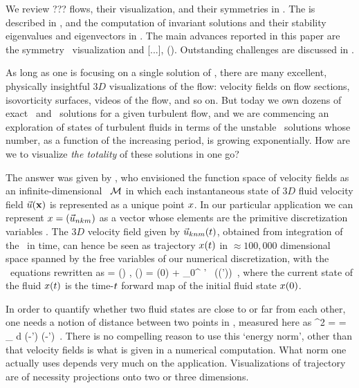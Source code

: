 We review  ??? flows, their visualization, and their symmetries in
. The {\mslices}  is described in ,
and the computation of invariant solutions and their stability
eigenvalues and eigenvectors in .
The main advances reported in this paper are the symmetry \reducedsp\
visualization and [...], (). Outstanding challenges are
discussed in \refsect{s:concl}.


As long as one is focusing on a single solution of \NSe, there are many
excellent, physically insightful $3D$ visualizations of the flow:
velocity fields on flow sections, isovorticity surfaces, videos of the
flow, and so on. But today we own dozens of exact \eqv\ and \reqv\
solutions for a given turbulent flow, and we are commencing an exploration of
states of turbulent fluids in terms of the unstable \po\ solutions whose
number, as a function of the increasing period, is growing exponentially.
How are we to visualize \emph{the totality} of these solutions in one go?

The answer was given by \cite{hopf48}, who envisioned the function space
of {\NS} velocity fields as an infinite-dimensional \statesp\ ${\cal M}$ in
which each instantaneous state of $3D$ fluid velocity field $\vec{u}({\bf x})$ is
represented as a unique point $x$. In our particular application we
can represent $x = (\vec{u}_{nkm})$ as a vector whose elements are the
primitive discretization variables \refeq{pipeDiscr}. The $3D$ velocity
field given by $\vec{u}_{knm}(t)$, obtained from integration of the
\NSe\ in time, can hence be seen as trajectory $x(t)$ in
$\approx 100,000$ dimensional space spanned by the free variables of our
numerical discretization, with the \NS\ equations 
rewritten as
\beq
   \dot{\ssp} = \vel(\ssp) ,
   \qquad
   \ssp(\zeit) = \ssp(0)
            + \int_0^\zeit \! \zeit' \, \vel(\ssp(\zeit'))
\,,
\ee{symbolicNS}
where the current state of the fluid $ x(t)$ is the time-$t$
forward map of the initial fluid state  $x(0)$.

In order to quantify whether two fluid states are close to or far from
each other, one needs a notion of distance between two points in
\statesp, measured here as
\beq
  ^2  =  =
\int_\bCell \! d \bx \;
(-') \cdot (-')
\,.
There is no compelling reason to use this {`energy norm'}, other than
that velocity fields is what is given in a numerical computation. What
norm one actually uses depends very much on the application.
Visualizations of trajectory \refeq{symbolicNS} are of necessity
projections onto two or three dimensions.

